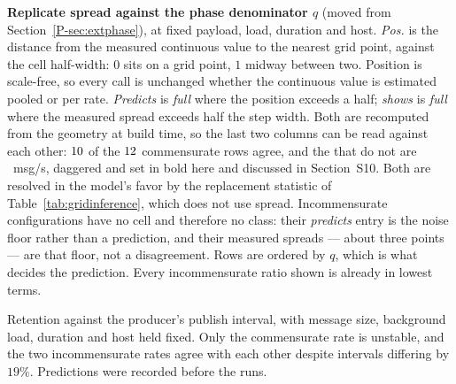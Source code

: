 \documentclass[10pt,journal,onecolumn]{IEEEtran}
\newcommand{\mainPhase}{\ref{P-sec:extphase}}            %
\begin{document}
\begin{table}[t]
\caption[Replicate spread against the phase denominator $q$]{\textbf{Replicate spread against the phase denominator $q$} (moved from
Section~\mainPhase{}), at fixed payload,
load, duration and host. \textnormal{\textit{Pos.}} is the distance from the measured continuous value
to the nearest grid point, against the cell half-width: $0$ sits on a grid point, $1$
midway between two. Position is scale-free, so every call is unchanged whether the
continuous value is estimated pooled or per rate. \textnormal{\textit{Predicts}} is
\textnormal{\textit{full}} where the position exceeds a half; \textnormal{\textit{shows}} is
\textnormal{\textit{full}} where the measured spread exceeds half the step width. Both are
recomputed from the geometry at build time, so the last two columns can be read against each
other: $\spreadAgree$ of the $\spreadArms$ commensurate rows agree, and the
\spreadMissWord{} that do not are \spreadMissRates{}~msg/s, daggered and set in bold here and
discussed in Section~S10. Both are resolved in the model's favor by the
replacement statistic of Table~\ref{tab:gridinference}, which does not use spread.
Incommensurate configurations have no cell and therefore no class: their \textnormal{\textit{predicts}}
entry is the noise floor rather than a prediction, and their measured spreads --- about three
points --- are that floor, not a disagreement. Rows are ordered by $q$, which is what decides
the prediction. Every incommensurate ratio shown is already in lowest terms.}
\label{tab:quantization}
\footnotesize
\centering
\setlength{\tabcolsep}{3.5pt}

\end{table}

\begin{table}[t]
\caption{Retention against the producer's publish interval, with message size, background load,
duration and host held fixed. Only the commensurate rate is unstable, and the two incommensurate
rates agree with each other despite intervals differing by $19\%$. Predictions were recorded
before the runs.}
\label{tab:interval}
\small

\end{table}
\end{document}
